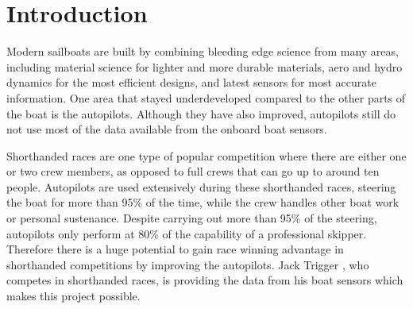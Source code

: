 \documentclass[12pt,twoside]{report}
\date{May 2021}
\begin{document}



\pagestyle{fancy}

\tableofcontents 


\clearpage{\pagestyle{empty}%
}
\fancyhead[LE,RO]{\slshape \rightmark}
\fancyhead[LO,RE]{\slshape \leftmark}


\chapter{Introduction}


Modern sailboats are built by combining bleeding edge science from many areas, including material science for lighter and more durable materials, aero and hydro dynamics for the most efficient designs, and latest sensors for most accurate information. One area that stayed underdeveloped compared to the other parts of the boat is the autopilots. Although they have also improved, autopilots still do not use most of the data available from the onboard boat sensors.

Shorthanded races are one type of popular competition where there are either one or two crew members, as opposed to full crews that can go up to around ten people. Autopilots are used extensively during these shorthanded races, steering the boat for more than 95\% of the time, while the crew handles other boat work or personal sustenance. Despite carrying out more than 95\% of the steering, autopilots only perform at 80\% of the capability of a professional skipper. Therefore there is a huge potential to gain race winning advantage in shorthanded competitions by improving the autopilots. Jack Trigger \cite{trigger-racing}, who competes in shorthanded races, is providing the data from his boat sensors which makes this project possible. 
\end{document}

